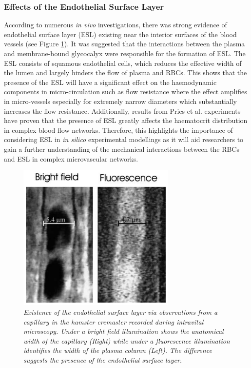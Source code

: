 \subsubsection{Effects of the Endothelial Surface Layer}
\noindent According to numerous \textit{in vivo} investigations\cite{Pries2000TheLayer, ReitsmaSietze2007Tegc, WeinbaumSheldon2007Tsaf, SmithMichaelL2003Nmra, A.R.Pries2005Mbvi}, there was strong evidence of endothelial surface layer (ESL) existing near the interior surfaces of the blood vessels (see Figure \ref{EndothelialSurfaceLaye}). It was suggested that the interactions between the plasma and membrane-bound glycocalyx were responsible for the formation of ESL.\cite{Pries2000TheLayer} The ESL consists of squamous endothelial cells, which reduces the effective width of the lumen and largely hinders the flow of plasma and RBCs.\cite{Pries2000TheLayer, WeinbaumSheldon2007Tsaf} This shows that the presence of the ESL will have a significant effect on the haemodynamic components in micro-circulation such as flow resistance where the effect amplifies in micro-vessels especially for extremely narrow diameters which substantially increases the flow resistance. Additionally, results from Pries et al.\cite{PriesAR1990BFiM, PriesAR1994RtBF, Pries2000TheLayer} experiments have proven that the presence of ESL greatly affects the haematocrit distribution in complex blood flow networks. Therefore, this highlights the importance of considering ESL in \textit{in silico} experimental modellings as it will aid researchers to gain a further understanding of the mechanical interactions between the RBCs and ESL in complex microvascular networks. 

\begin{figure}[H]
\centering
\includegraphics[width=0.7\textwidth]{images/EndothelialSurfaceLayer.png}
\caption{\textit{Existence of the endothelial surface layer via observations from a capillary in the hamster cremaster recorded during intravital microscopy. Under a bright field illumination shows the anatomical width of the capillary (Right) while under a fluorescence illumination identifies the width of the plasma column (Left). The difference suggests the presence of the endothelial surface layer.\cite{Pries2000TheLayer}} \label{EndothelialSurfaceLaye}}
\end{figure}


